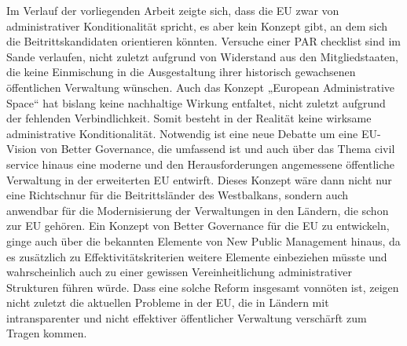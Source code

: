 Im Verlauf der vorliegenden Arbeit zeigte sich, dass die EU zwar von administrativer Konditionalität spricht, es aber kein Konzept gibt, an dem sich die Beitrittskandidaten orientieren könnten. Versuche einer PAR checklist sind im Sande verlaufen, nicht zuletzt aufgrund von Widerstand aus den Mitgliedstaaten, die keine Einmischung in die Ausgestaltung ihrer historisch gewachsenen öffentlichen Verwaltung wünschen. Auch das Konzept „European Administrative Space“ hat bislang keine nachhaltige Wirkung entfaltet, nicht zuletzt aufgrund der fehlenden Verbindlichkeit. Somit besteht in der Realität keine wirksame administrative Konditionalität. Notwendig ist eine neue Debatte um eine EU-Vision von Better Governance, die umfassend ist und auch über das Thema civil service hinaus eine moderne und den Herausforderungen angemessene öffentliche Verwaltung in der erweiterten EU entwirft. Dieses Konzept wäre dann nicht nur eine Richtschnur für die Beitrittsländer des Westbalkans, sondern auch anwendbar für die Modernisierung der Verwaltungen in den Ländern, die schon zur EU gehören. Ein Konzept von Better Governance für die EU zu entwickeln, ginge auch über die bekannten Elemente von New Public Management hinaus, da es zusätzlich zu Effektivitätskriterien weitere Elemente einbeziehen müsste und wahrscheinlich auch zu einer gewissen Vereinheitlichung administrativer Strukturen führen würde. Dass eine solche Reform insgesamt vonnöten ist, zeigen nicht zuletzt die aktuellen Probleme in der EU, die in Ländern mit intransparenter und nicht effektiver öffentlicher Verwaltung verschärft zum Tragen kommen.

